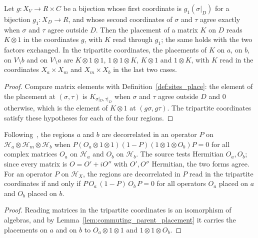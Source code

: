 \begin{lemma}
    \label{lem:commuting_parent_placement}
    \leanok
    Let $g:X_V\to R\times C$ be a bijection whose first coordinate is $g_1(\sigma|_D)$ for
    a bijection $g_1:X_D\to R$, and whose second coordinates of $\sigma$ and $\tau$ agree
    exactly when $\sigma$ and $\tau$ agree outside $D$. Then the placement of a matrix
    $K$ on $D$ reads $K\otimes1$ in the coordinates $g$, with $K$ read through $g_1$; the
    same holds with the two factors exchanged. In the tripartite coordinates, the
    placements of $K$ on $a$, on $b$, on $V\setminus b$ and on $V\setminus a$ are
    $K\otimes1\otimes1$, $1\otimes1\otimes K$, $K\otimes1$ and $1\otimes K$, with $K$
    read in the coordinates $X_a\times X_m$ and $X_m\times X_b$ in the last two cases.
\end{lemma}
\begin{proof}\leanok
    Compare matrix elements with Definition~\ref{def:sites_place}: the element of the
    placement at $(\sigma,\tau)$ is $K_{\sigma|_D,\tau|_D}$ when $\sigma$ and $\tau$
    agree outside $D$ and $0$ otherwise, which is the element of $K\otimes1$ at
    $(g\sigma,g\tau)$. The tripartite coordinates satisfy these hypotheses for each of
    the four regions.
\end{proof}

\begin{lemma}
    \label{lem:commuting_parent_decorrelation}
    \leanok
    Following~\cite[Definition~D.1, lines 2187--2191]{Cirac2016MPDO_arXiv}, the regions
    $a$ and $b$ are decorrelated in an operator $P$ on
    $\mathcal H_a\otimes\mathcal H_m\otimes\mathcal H_b$ when
    $P(O_a\otimes1\otimes1)(1-P)(1\otimes1\otimes O_b)P=0$ for all complex matrices $O_a$
    on $\mathcal H_a$ and $O_b$ on $\mathcal H_b$. The source tests Hermitian $O_a,O_b$;
    since every matrix is $O=O'+iO''$ with $O',O''$ Hermitian, the two forms agree. For an
    operator $P$ on $\mathcal H_X$, the regions are decorrelated in $P$ read in the
    tripartite coordinates if and only if $P\,O_a\,(1-P)\,O_b\,P=0$ for all operators
    $O_a$ placed on $a$ and $O_b$ placed on $b$.
\end{lemma}
\begin{proof}\leanok
    Reading matrices in the tripartite coordinates is an isomorphism of algebras, and by
    Lemma~\ref{lem:commuting_parent_placement} it carries the placements on $a$ and on
    $b$ to $O_a\otimes1\otimes1$ and $1\otimes1\otimes O_b$.
\end{proof}

